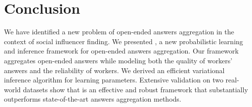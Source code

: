 \section{Conclusion}

We have identified a new problem of open-ended answers aggregation in the context of social influencer finding. We presented \sys, a new probabilistic learning and inference framework for open-ended answers aggregation. Our framework aggregates open-ended answers while modeling both the quality of workers' answers and the reliability of workers. We derived an efficient variational inference algorithm for learning \sys parameters. Extensive validation on two real-world datasets show that \sys is an effective and robust framework that substantially outperforms state-of-the-art answers aggregation methods.